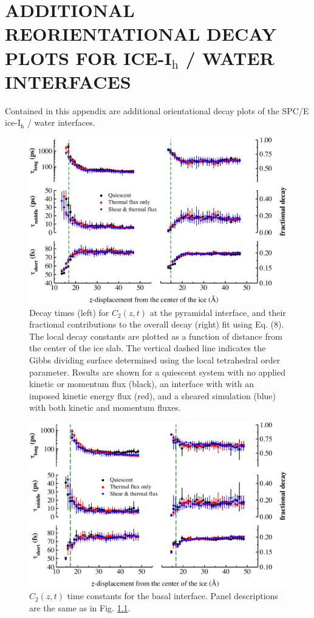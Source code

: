 \chapter{ADDITIONAL REORIENTATIONAL DECAY PLOTS FOR ICE-I$_\mathrm{h}$ / WATER INTERFACES}

Contained in this appendix are additional orientational decay plots of the SPC/E ice-I$_\mathrm{h}$ / water interfaces.



\begin{figure}
\includegraphics[width=\linewidth]{Figures/Pyr_lcorrz}
\caption{\label{fig:Pyrorient} Decay times (left) for $C_2(z,t)$ at
  the pyramidal interface, and their fractional contributions to the
  overall decay (right) fit using Eq. (8). The local decay constants
  are plotted as a function of distance from the center of the ice
  slab. The vertical dashed line indicates the Gibbs dividing surface
  determined using the local tetrahedral order parameter.  Results are
  shown for a quiescent system with no applied kinetic or momentum
  flux (black), an interface with with an imposed kinetic energy flux
  (red), and a sheared simulation (blue) with both kinetic and
  momentum fluxes.}
\end{figure}

\begin{figure}
\includegraphics[width=\linewidth]{Figures/Bas_lcorrz}
\caption{\label{fig:Borient} $C_2(z,t)$ time constants for the basal
  interface.  Panel descriptions are the same as in
  Fig. \ref{fig:Pyrorient}. }
\end{figure}

